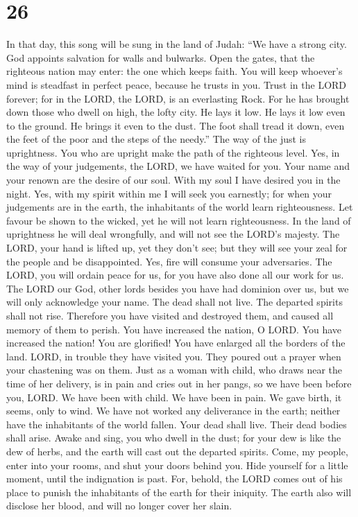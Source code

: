 \hypertarget{section-25}{%
\section{26}\label{section-25}}

 In that day, this song will be sung in the land of Judah:
``We have a strong city. God appoints salvation for walls and bulwarks.
 Open the gates, that the righteous nation may enter: the
one which keeps faith.  You will keep whoever's mind is
steadfast in perfect peace, because he trusts in you. 
Trust in the LORD forever; for in the LORD, the LORD, is an everlasting
Rock.  For he has brought down those who dwell on high,
the lofty city. He lays it low. He lays it low even to the ground. He
brings it even to the dust.  The foot shall tread it down,
even the feet of the poor and the steps of the needy.'' 
The way of the just is uprightness. You who are upright make the path of
the righteous level.  Yes, in the way of your judgements,
the LORD, we have waited for you. Your name and your renown are the
desire of our soul.  With my soul I have desired you in
the night. Yes, with my spirit within me I will seek you earnestly; for
when your judgements are in the earth, the inhabitants of the world
learn righteousness.  Let favour be shown to the wicked,
yet he will not learn righteousness. In the land of uprightness he will
deal wrongfully, and will not see the LORD's majesty. 
The LORD, your hand is lifted up, yet they don't see; but they will see
your zeal for the people and be disappointed. Yes, fire will consume
your adversaries.  The LORD, you will ordain peace for
us, for you have also done all our work for us.  The LORD
our God, other lords besides you have had dominion over us, but we will
only acknowledge your name.  The dead shall not live. The
departed spirits shall not rise. Therefore you have visited and
destroyed them, and caused all memory of them to perish. 
You have increased the nation, O LORD. You have increased the nation!
You are glorified! You have enlarged all the borders of the land.
 LORD, in trouble they have visited you. They poured out
a prayer when your chastening was on them.  Just as a
woman with child, who draws near the time of her delivery, is in pain
and cries out in her pangs, so we have been before you, LORD.
 We have been with child. We have been in pain. We gave
birth, it seems, only to wind. We have not worked any deliverance in the
earth; neither have the inhabitants of the world fallen. 
Your dead shall live. Their dead bodies shall arise. Awake and sing, you
who dwell in the dust; for your dew is like the dew of herbs, and the
earth will cast out the departed spirits.  Come, my
people, enter into your rooms, and shut your doors behind you. Hide
yourself for a little moment, until the indignation is past.
 For, behold, the LORD comes out of his place to punish
the inhabitants of the earth for their iniquity. The earth also will
disclose her blood, and will no longer cover her slain.

